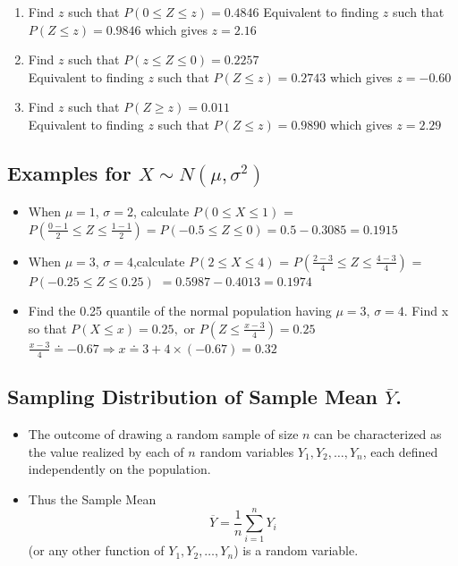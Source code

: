 \documentclass[
  letterpaper,
  DIV=11,
  numbers=noendperiod]{scrartcl}
\begin{document}
\begin{enumerate}
\def\labelenumi{\arabic{enumi}.}
\item
  Find \(z\) such that \(P(0 \leq Z \leq z) = 0.4846\) Equivalent to
  finding \(z\) such that \(P(Z \leq z) = 0.9846\) which gives
  \(z = 2.16\)
\item
  Find \(z\) such that \(P(z \leq Z \leq 0) = 0.2257\)\\
  Equivalent to finding \(z\) such that \(P(Z \leq z) = 0.2743\) which
  gives \(z = -0.60\)
\item
  Find \(z\) such that \(P(Z \geq z) = 0.011\)\\
  Equivalent to finding \(z\) such that \(P(Z \leq z) = 0.9890\) which
  gives \(z = 2.29\)
\end{enumerate}

\subsection{\texorpdfstring{Examples for
\(X \sim N(\mu, \sigma^2)\)}{Examples for X \textbackslash sim N(\textbackslash mu, \textbackslash sigma\^{}2)}}\label{examples-for-x-sim-nmu-sigma2}

\begin{itemize}
\item
  When \(\mu = 1\), \(\sigma = 2\), calculate \(P(0 \leq X \leq 1)\) =
  \(P(\frac{0-1}{2} \leq Z \leq \frac{1-1}{2})= P(-0.5 \leq Z \leq 0) = 0.5-0.3085=0.1915\)
\item
  When \(\mu = 3\), \(\sigma=4\),calculate \(P(2 \leq X \leq 4)\) =
  \(P(\frac{2-3}{4} \leq Z \leq \frac{4-3}{4})\) =
  \(P(- 0.25 \leq Z \leq 0.25)\) \(= 0.5987-0.4013=0.1974\)
\item
  Find the 0.25 quantile of the normal population having \(\mu = 3\),
  \(\sigma = 4\). Find x so that \(P(X \leq x) = 0.25,\) or
  \(P(Z \leq \frac{x-3}{4}) = 0.25\)
  \(\frac{x-3}{4} \doteq -0.67 \Rightarrow x \doteq 3+ 4 \times (-0.67)= 0.32\)
\end{itemize}

\subsection{\texorpdfstring{Sampling Distribution of Sample Mean
\(\bar{Y}\).}{Sampling Distribution of Sample Mean \textbackslash bar\{Y\}.}}\label{sampling-distribution-of-sample-mean-bary.}

\begin{itemize}
\item
  The outcome of drawing a random sample of size \(n\) can be
  characterized as the value realized by each of \(n\) {random
  variables} \(Y_1, Y_2, \ldots, Y_n\), each defined independently on
  the population.
\item
  Thus the {Sample Mean} \[\overline{Y} = \frac1n \sum_{i=1}^n Y_i\] (or
  any other function of \(Y_1, Y_2, \ldots, Y_n\)) is a {random
  variable}.
\end{itemize}
\end{document}

